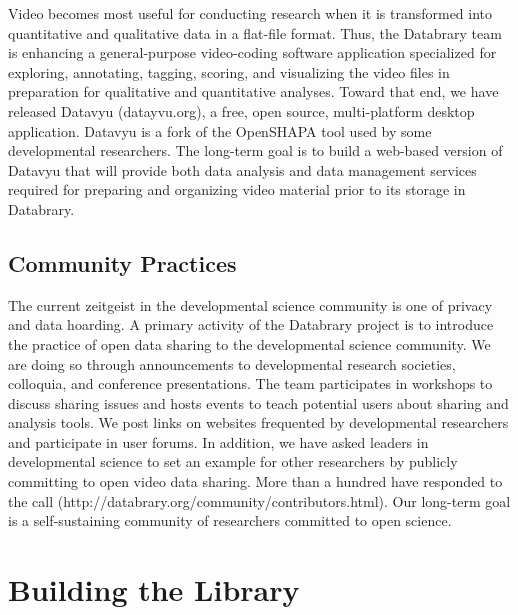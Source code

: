 \documentclass{sig-alternate}
\begin{document}
Video becomes most useful for conducting research when it is transformed
into quantitative and qualitative data in a flat-file format. Thus, the
Databrary team is enhancing a general-purpose video-coding software
application specialized for exploring, annotating, tagging, scoring, and
visualizing the video files in preparation for qualitative and
quantitative analyses. Toward that end, we have released Datavyu
(datayvu.org), a free, open source, multi-platform desktop application.
Datavyu is a fork of the OpenSHAPA tool used by some developmental
researchers. The long-term goal is to build a web-based version of
Datavyu that will provide both data analysis and data management
services required for preparing and organizing video material prior to
its storage in Databrary.

\subsection{Community Practices}

The current zeitgeist in the developmental science community is one of
privacy and data hoarding. A primary activity of the Databrary project
is to introduce the practice of open data sharing to the developmental
science community. We are doing so through announcements to
developmental research societies, colloquia, and conference
presentations. The team participates in workshops to discuss sharing
issues and hosts events to teach potential users about sharing and
analysis tools. We post links on websites frequented by developmental
researchers and participate in user forums. In addition, we have asked
leaders in developmental science to set an example for other researchers
by publicly committing to open video data sharing. More than a hundred
have responded to the call
(http://databrary.org/community/contributors.html). Our long-term goal
is a self-sustaining community of researchers committed to open
science.

\section{Building the Library}
\end{document}
